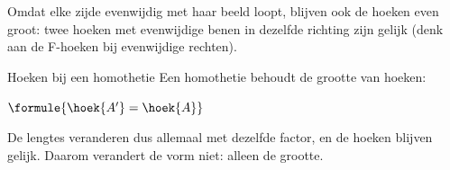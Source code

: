 Omdat elke zijde evenwijdig met haar beeld loopt, blijven ook de hoeken even groot: twee hoeken met evenwijdige benen in dezelfde richting zijn gelijk (denk aan de F-hoeken bij evenwijdige rechten).

\begin{theorie}
\begin{stelling}{Hoeken bij een homothetie}
Een homothetie behoudt de grootte van hoeken:

\vspace{1mm}
\qquad $\formule{\hoek{A'} = \hoek{A}}$
\end{stelling}
\end{theorie}

De lengtes veranderen dus allemaal met dezelfde factor, en de hoeken blijven gelijk. Daarom verandert de vorm niet: alleen de grootte.


\begin{oefeningen}
\end{oefeningen}

